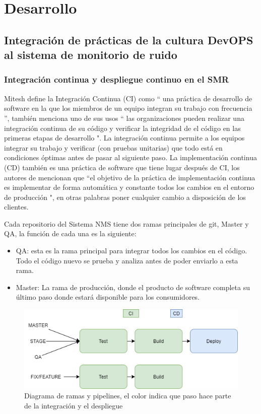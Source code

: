 \chapter{Desarrollo}
\section{Integración de prácticas de la cultura DevOPS al sistema de monitorio de ruido}
\subsection{Integración continua y despliegue continuo en el SMR}
Mitesh \cite {ci} define la Integración Continua (CI) como `` una práctica de desarrollo de software en la que los miembros de un equipo integran su trabajo con frecuencia '', también menciona uno de sus usos `` las organizaciones pueden realizar una integración continua de su código y verificar la integridad de el código en las primeras etapas de desarrollo ". La integración continua permite a los equipos integrar su trabajo y verificar (con pruebas unitarias) que todo está en condiciones óptimas antes de pasar al siguiente paso. La implementación continua (CD) también es una práctica de software que tiene lugar después de CI, los autores de \cite {CD} mencionan que ``el objetivo de la práctica de implementación continua es implementar de forma automática y constante todos los cambios en el entorno de producción ", en otras palabras poner cualquier cambio a disposición de los clientes.

Cada repositorio del Sistema NMS tiene dos ramas principales de git, Master y QA, la función de cada una es la siguiente:

\begin {itemize}
\item QA: esta es la rama principal para integrar todos los cambios en el código. Todo el código nuevo se prueba y analiza antes de poder enviarlo a esta rama.
\item Master: La rama de producción, donde el producto de software completa su último paso donde estará disponible para los consumidores.
\end {itemize}

\begin{figure}[H]
	\centering
	\includegraphics[width=\linewidth]{bibliografia/Imagenes/ci_cd branch Diagram.png}
	\caption{Diagrama de ramas y pipelines, el color indica que paso hace parte de la integración y el despliegue}
	\label{pipelines}
\end{figure}

